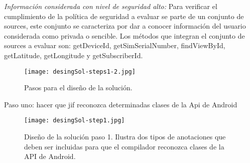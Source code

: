 \textit{Información considerada con nivel de seguridad alto:}\newline
Para verificar el cumplimiento de la política de seguridad a evaluar se parte de
un conjunto de sources, este conjunto se caracteriza por dar a conocer
información del usuario considerada como privada o sencible. Los métodos
que integran el conjunto de sources a evaluar son: getDeviceId,
getSimSerialNumber, findViewById, getLatitude, getLongitude y getSubscriberId.


\begin{figure}[h!]
	\begin{center}
	\texttt{[image: desingSol-steps1-2.jpg]}
	\end{center}
	\caption{Pasos para el diseño de la solución.}
	\label{fig:desingSol-steps1-2}
\end{figure}

Paso uno: hacer que jif reconozca determinadas clases de la Api de
Android\newline 

\begin{figure}[h!]
	\begin{center}
	\texttt{[image: desingSol-step1.jpg]}
	\end{center}
	\caption{Diseño de la solución paso 1. Ilustra dos tipos de anotaciones que
	deben ser incluidas para que el compilador reconozca clases de la API de
	Android.}
	\label{fig:desingSol-step1}
\end{figure}

